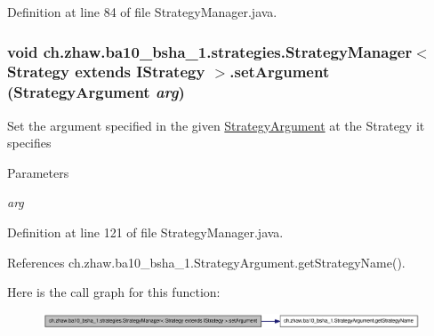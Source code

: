 Definition at line 84 of file StrategyManager.java.\hypertarget{classch_1_1zhaw_1_1ba10__bsha__1_1_1strategies_1_1StrategyManager_3_01Strategy_01extends_01IStrategy_01_4_acc0184c50f60dfb73730396fd6eab5c6}{
\subsubsection[{setArgument}]{\setlength{\rightskip}{0pt plus 5cm}void ch.zhaw.ba10\_\-bsha\_\-1.strategies.StrategyManager$<$ Strategy extends {\bf IStrategy} $>$.setArgument ({\bf StrategyArgument} {\em arg})}}
\label{classch_1_1zhaw_1_1ba10__bsha__1_1_1strategies_1_1StrategyManager_3_01Strategy_01extends_01IStrategy_01_4_acc0184c50f60dfb73730396fd6eab5c6}
Set the argument specified in the given \hyperlink{classch_1_1zhaw_1_1ba10__bsha__1_1_1StrategyArgument}{StrategyArgument} at the Strategy it specifies


\begin{DoxyParams}{Parameters}
\item[{\em arg}]\end{DoxyParams}


Definition at line 121 of file StrategyManager.java.

References ch.zhaw.ba10\_\-bsha\_\-1.StrategyArgument.getStrategyName().

Here is the call graph for this function:\nopagebreak
\begin{figure}[H]
\begin{center}
\leavevmode
\includegraphics[width=392pt]{classch_1_1zhaw_1_1ba10__bsha__1_1_1strategies_1_1StrategyManager_3_01Strategy_01extends_01IStrategy_01_4_acc0184c50f60dfb73730396fd6eab5c6_cgraph}
\end{center}
\end{figure}


